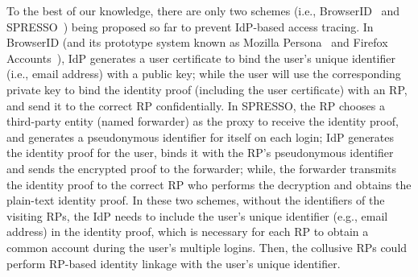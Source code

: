 To the best of our knowledge, there are only two schemes (i.e., BrowserID~\cite{BrowserID} and SPRESSO~\cite{SPRESSO}) being proposed so far to prevent IdP-based access tracing.
In BrowserID (and its prototype system known as Mozilla Persona~\cite{persona} and Firefox Accounts~\cite{FirefoxAccount}),
 IdP generates a user certificate to bind the user's unique identifier (i.e., email address) with a public key;
 while the user will use the corresponding private key to bind the identity proof (including the user certificate) with an RP, and send it to the correct RP confidentially.
In SPRESSO, the RP chooses a third-party entity (named forwarder) as the proxy to receive the identity proof,
 and generates a pseudonymous identifier for itself on each login;
 IdP generates the identity proof for the user,  binds it with the RP's pseudonymous identifier and sends the encrypted proof to the forwarder;
 while, the forwarder transmits the identity proof to the correct RP who performs the decryption and obtains the plain-text identity proof.
In these two schemes, without the identifiers of the visiting RPs,
the IdP needs to include the user's unique identifier (e.g., email address) in the identity proof,
 which is necessary for  each RP to  obtain a common account during the user's multiple logins.
Then, the collusive RPs could  perform RP-based identity linkage with the user's unique identifier.





